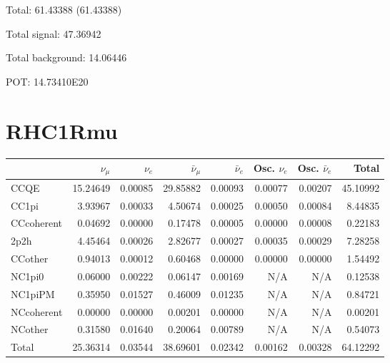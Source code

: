 \documentclass[10pt,a4paper]{article}
\begin{document}
Total: 61.43388    (61.43388)


Total signal: 47.36942


Total background: 14.06446

POT: 14.73410E20



\clearpage


\section*{RHC1Rmu}
\begin{tabular} { | l ||r | r | r | r | r | r | | r | }
\hline
              & $\nu_\mu$            & $\nu_e$              & $\bar{\nu}_{\mu}$    & $\bar{\nu}_{e}$      & Osc. $\nu_e$         & Osc. $\bar{\nu}_{e}$ & Total                \\ \hline\hline
 CCQE         & 15.24649             & 0.00085              & 29.85882             & 0.00093              & 0.00077              & 0.00207              & 45.10992             \\ \hline
 CC1pi        & 3.93967              & 0.00033              & 4.50674              & 0.00025              & 0.00050              & 0.00084              & 8.44835              \\ \hline
 CCcoherent   & 0.04692              & 0.00000              & 0.17478              & 0.00005              & 0.00000              & 0.00008              & 0.22183              \\ \hline
 2p2h         & 4.45464              & 0.00026              & 2.82677              & 0.00027              & 0.00035              & 0.00029              & 7.28258              \\ \hline
 CCother      & 0.94013              & 0.00012              & 0.60468              & 0.00000              & 0.00000              & 0.00000              & 1.54492              \\ \hline
 NC1pi0       & 0.06000              & 0.00222              & 0.06147              & 0.00169              & N/A                  & N/A                  & 0.12538              \\ \hline
 NC1piPM      & 0.35950              & 0.01527              & 0.46009              & 0.01235              & N/A                  & N/A                  & 0.84721              \\ \hline
 NCcoherent   & 0.00000              & 0.00000              & 0.00201              & 0.00000              & N/A                  & N/A                  & 0.00201              \\ \hline
 NCother      & 0.31580              & 0.01640              & 0.20064              & 0.00789              & N/A                  & N/A                  & 0.54073              \\ \hline
\hline
 Total        & 25.36314             & 0.03544              & 38.69601             & 0.02342              & 0.00162              & 0.00328              & 64.12292             \\ \hline

\end{tabular}
\end{document}
